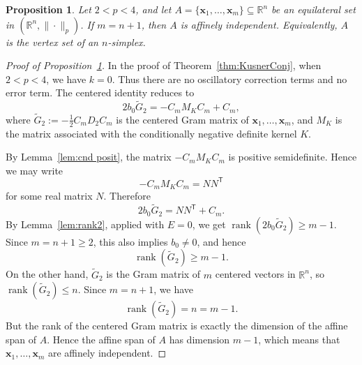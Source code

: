 \documentclass[11pt]{article}
\newtheorem{prop}[theorem]{Proposition}
\theoremstyle{definition}
\begin{document}
\begin{prop}\label{prop:equality-affine-independent}
Let \(2<p<4\), and let
\(
A=\{\boldsymbol{x}_1,\dots,\boldsymbol{x}_m\}\subseteq \mathbb R^n
\)
be an equilateral set in \((\mathbb R^n,\|\cdot\|_p)\). If \(m=n+1\), then \(A\) is affinely independent. Equivalently, \(A\) is the vertex set of an \(n\)-simplex.
\end{prop}

\begin{proof}[Proof of Proposition~\ref{prop:equality-affine-independent}]
In the proof of Theorem~\ref{thm:KusnerConj}, when \(2<p<4\), we have \(k=0\). Thus there are no oscillatory correction terms and no error term. The centered identity reduces to
\[
2b_0\widetilde G_2=-C_mM_KC_m+C_m,
\]
where
\(
\widetilde G_2:=-\frac12 C_mD_2C_m
\)
is the centered Gram matrix of \(\boldsymbol{x}_1,\dots,\boldsymbol{x}_m\), and \(M_K\) is the matrix associated with the conditionally negative definite kernel \(K\).

By Lemma~\ref{lem:cnd posit}, the matrix \(-C_mM_KC_m\) is positive semidefinite. Hence we may write
\[
-C_mM_KC_m=NN^{\mathsf T}
\]
for some real matrix \(N\). Therefore
\[
2b_0\widetilde G_2=NN^{\mathsf T}+C_m.
\]
By Lemma~\ref{lem:rank2}, applied with \(E=0\), we get
\(
\operatorname{rank}(2b_0\widetilde G_2)\ge m-1.
\)
Since \(m=n+1\ge2\), this also implies \(b_0\ne0\), and hence
\[
\operatorname{rank}(\widetilde G_2)\ge m-1.
\]
On the other hand, \(\widetilde G_2\) is the Gram matrix of \(m\) centered vectors in \(\mathbb R^n\), so
\(
\operatorname{rank}(\widetilde G_2)\le n.
\)
Since \(m=n+1\), we have
\[
\operatorname{rank}(\widetilde G_2)=n=m-1.
\]
But the rank of the centered Gram matrix is exactly the dimension of the affine span of \(A\). Hence the affine span of \(A\) has dimension \(m-1\), which means that \(\boldsymbol{x}_1,\dots,\boldsymbol{x}_m\) are affinely independent.
\end{proof}
\end{document}
